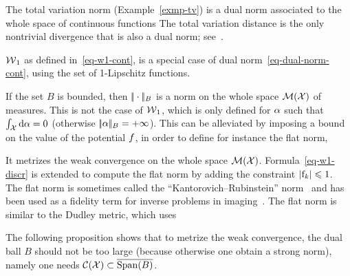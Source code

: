 \begin{example}
The total variation norm (Example~\ref{exmp-tv}) is a dual norm associated to the whole space of continuous functions
The total variation distance is the only nontrivial divergence that is also a dual norm; see~\cite{sriperumbudur2009integral}. 
\end{example}

\begin{example}
$\operatorname{\mathcal{W}}_1$ as defined in~\eqref{eq-w1-cont}, is a special case of dual norm~\eqref{eq-dual-norm-cont}, using
the set of 1-Lipschitz functions.
\end{example}

\begin{example}
If the set $B$ is bounded, then $|\!| \cdot |\!|_B$ is a norm on the whole space $\mathcal{M}(\mathcal{X})$ of measures.
%
This is not the case of $\operatorname{\mathcal{W}}_1$, which is only defined for $\alpha$ such that $\int_{\mathcal{X}} \mathrm{d}\alpha=0$ (otherwise $|\!| \alpha |\!|_B=+\infty$). 
%
This can be alleviated by imposing a bound on the value of the potential $f$, in order to define for instance the flat norm, 
 
It metrizes the weak convergence on the whole space $\mathcal{M}(\mathcal{X})$.
% 
Formula~\eqref{eq-w1-discr} is extended to compute the flat norm by adding the constraint $\left\lvert\mathrm{f}_k\right\rvert \leqslant 1$.
%
The flat norm is sometimes called the ``Kantorovich--Rubinstein'' norm~\cite{hanin1992kantorovich} and has been used as a fidelity term for inverse problems in imaging~\cite{lellmann2014imaging}.
%
The flat norm is  similar to the Dudley metric, which uses
\end{example}

The following proposition shows that to metrize the weak convergence, the dual ball $B$ should not be too large (because otherwise one obtain a strong norm), namely one needs $\mathcal{C}(\mathcal{X}) \subset \overline{\operatorname{Span}(B)}$.

